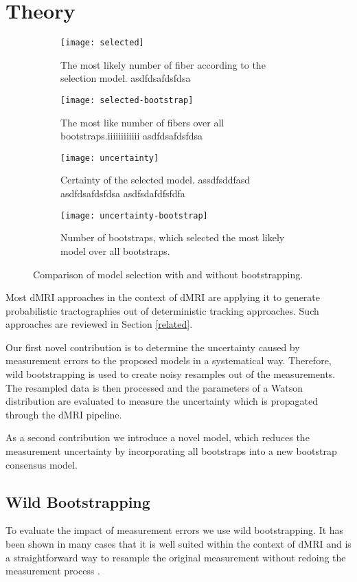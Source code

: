 \section{Theory}
\begin{figure*}[h]
	\centering
	\begin{subfigure}[b]{0.24\linewidth}
		\texttt{[image: selected]}
		\caption{The most likely number of fiber according to the
		selection model. {\color{white}asdfdsafdsfdsa}}
	\end{subfigure}
	\begin{subfigure}[b]{0.24\linewidth}
		\texttt{[image: selected-bootstrap]}
		\caption{The most like number of fibers over all
		bootstraps.{\color{white}iiiiiiiiiiii asdfdsafdsfdsa}}
\end{subfigure}  
	\begin{subfigure}[b]{0.24\linewidth}
		\texttt{[image: uncertainty]}
		\caption{Certainty of the selected model.
		{\color{white}assdfsddfasd asdfdsafdsfdsa asdfsdafdfsfdfa}}
	\end{subfigure}
	\begin{subfigure}[b]{0.24\linewidth}
		\texttt{[image: uncertainty-bootstrap]}
		\caption{Number of bootstraps, which selected the most likely
		model over all bootstraps.}
	\end{subfigure}
	\caption{Comparison of model selection with and without bootstrapping.}
	\label{fig:selected-uncertainty}
\end{figure*}

Most dMRI approaches in the context of dMRI are applying it to generate
probabilistic tractographies out of deterministic tracking approaches. Such
approaches are reviewed in Section \ref{related}. 

Our first novel contribution is to determine the uncertainty caused by
measurement errors to the proposed models in a systematical way. Therefore, wild bootstrapping is used to create
noisy resamples out of the measurements. The resampled data is then processed
and the parameters of a Watson distribution are evaluated to measure the
uncertainty which is propagated through the dMRI pipeline. 

As a second contribution we introduce a novel model, which reduces the measurement
uncertainty by incorporating all bootstraps into a new bootstrap consensus model.

\subsection{Wild Bootstrapping}
To evaluate the impact of measurement errors we use wild bootstrapping. It
has been shown in many cases that it is well suited within the context of dMRI and
is a straightforward way to
resample the original measurement without redoing the measurement process
\cite{Jones:2008}.

